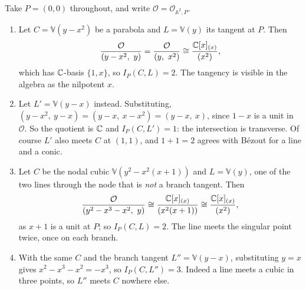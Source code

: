 \documentclass[a4paper]{scrartcl}
\newcommand{\A}{\mathbb{A}}
\newcommand{\V}{\mathbb{V}}
\newcommand{\Oh}{\mathcal{O}}
\begin{document}
\begin{example}\label{ex:intmultcomputations}
	Take $P = (0,0)$ throughout, and write $\Oh = \Oh_{\A^2,P}$.
	\begin{enumerate}[label=(\roman*)]
		\item Let $C = \V(y - x^2)$ be a parabola and $L = \V(y)$ its tangent at $P$. Then
		$$\frac{\Oh}{(y-x^2,\ y)} = \frac{\Oh}{(y,\ x^2)} \cong \frac{\C[x]_{(x)}}{(x^2)},$$
		which has $\mathbb{C}$-basis $\{1,x\}$, so $I_P(C,L) = 2$. The tangency is visible in the algebra as the nilpotent $x$.
		\item Let $L' = \V(y - x)$ instead. Substituting, $(y-x^2,\ y-x) = (y-x,\ x - x^2) = (y-x,\ x)$, since $1-x$ is a unit in $\Oh$. So the quotient is $\mathbb{C}$ and $I_P(C,L') = 1$: the intersection is transverse. Of course $L'$ also meets $C$ at $(1,1)$, and $1 + 1 = 2$ agrees with B\'ezout for a line and a conic.
		\item Let $C$ be the nodal cubic $\V(y^2 - x^2(x+1))$ and $L = \V(y)$, one of the two lines through the node that is \emph{not} a branch tangent. Then
		$$\frac{\Oh}{(y^2-x^3-x^2,\ y)} \cong \frac{\C[x]_{(x)}}{(x^2(x+1))} \cong \frac{\C[x]_{(x)}}{(x^2)},$$
		as $x+1$ is a unit at $P$; so $I_P(C,L) = 2$. The line meets the singular point twice, once on each branch.
		\item With the same $C$ and the branch tangent $L'' = \V(y-x)$, substituting $y = x$ gives $x^2 - x^3 - x^2 = -x^3$, so $I_P(C,L'') = 3$. Indeed a line meets a cubic in three points, so $L''$ meets $C$ nowhere else.
	\end{enumerate}
\end{example}

\begin{center}
\end{center}
\end{document}
